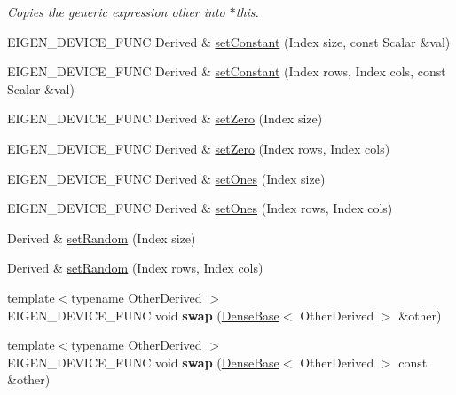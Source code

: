 \begin{DoxyCompactItemize}
\begin{DoxyCompactList}\small\item\em Copies the generic expression {\itshape other} into $\ast$this. \end{DoxyCompactList}\item 
E\+I\+G\+E\+N\+\_\+\+D\+E\+V\+I\+C\+E\+\_\+\+F\+U\+NC Derived \& \mbox{\hyperlink{class_eigen_1_1_plain_object_base_ac8dea1df3d92b752cc683ff42abf6f9b}{set\+Constant}} (Index size, const Scalar \&val)
\item 
E\+I\+G\+E\+N\+\_\+\+D\+E\+V\+I\+C\+E\+\_\+\+F\+U\+NC Derived \& \mbox{\hyperlink{class_eigen_1_1_plain_object_base_a56d1fe5d2156174f88341e563bb3c5a9}{set\+Constant}} (Index rows, Index cols, const Scalar \&val)
\item 
E\+I\+G\+E\+N\+\_\+\+D\+E\+V\+I\+C\+E\+\_\+\+F\+U\+NC Derived \& \mbox{\hyperlink{class_eigen_1_1_plain_object_base_ac21ad5f989f320e46958b75ac8d9a1da}{set\+Zero}} (Index size)
\item 
E\+I\+G\+E\+N\+\_\+\+D\+E\+V\+I\+C\+E\+\_\+\+F\+U\+NC Derived \& \mbox{\hyperlink{class_eigen_1_1_plain_object_base_a4f7022ad80446854a068d4d3bfa98446}{set\+Zero}} (Index rows, Index cols)
\item 
E\+I\+G\+E\+N\+\_\+\+D\+E\+V\+I\+C\+E\+\_\+\+F\+U\+NC Derived \& \mbox{\hyperlink{class_eigen_1_1_plain_object_base_a2871e88e1feb1cc665fa1f1cc800078b}{set\+Ones}} (Index size)
\item 
E\+I\+G\+E\+N\+\_\+\+D\+E\+V\+I\+C\+E\+\_\+\+F\+U\+NC Derived \& \mbox{\hyperlink{class_eigen_1_1_plain_object_base_a8e3043e7a51c524c1d1793a3e9826819}{set\+Ones}} (Index rows, Index cols)
\item 
Derived \& \mbox{\hyperlink{class_eigen_1_1_plain_object_base_af0e576a0e1aefc9ee346de44cc352ba3}{set\+Random}} (Index size)
\item 
Derived \& \mbox{\hyperlink{class_eigen_1_1_plain_object_base_a2139f7c1a6711ebd86c4ff6378f5e775}{set\+Random}} (Index rows, Index cols)
\item 
\mbox{\label{class_eigen_1_1_plain_object_base_aa86254240c534cc55143f38af58c8bdf}} 
{\footnotesize template$<$typename Other\+Derived $>$ }\\E\+I\+G\+E\+N\+\_\+\+D\+E\+V\+I\+C\+E\+\_\+\+F\+U\+NC void {\bfseries swap} (\mbox{\hyperlink{class_eigen_1_1_dense_base}{Dense\+Base}}$<$ Other\+Derived $>$ \&other)
\item 
\mbox{\label{class_eigen_1_1_plain_object_base_a7a975e6a0ec50637ef56e72dc732717e}} 
{\footnotesize template$<$typename Other\+Derived $>$ }\\E\+I\+G\+E\+N\+\_\+\+D\+E\+V\+I\+C\+E\+\_\+\+F\+U\+NC void {\bfseries swap} (\mbox{\hyperlink{class_eigen_1_1_dense_base}{Dense\+Base}}$<$ Other\+Derived $>$ const \&other)
\end{DoxyCompactItemize}
